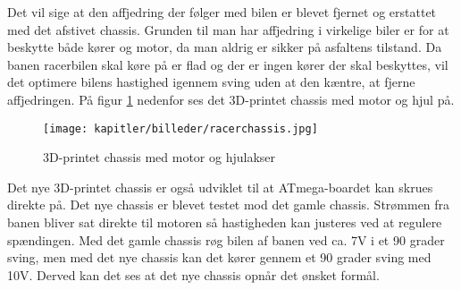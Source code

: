 Det vil sige at den affjedring der følger med bilen er blevet fjernet og erstattet med det afstivet chassis. Grunden til man har affjedring i virkelige biler er for at beskytte både kører og motor, da man aldrig er sikker på asfaltens tilstand. Da banen racerbilen skal køre på er flad og der er ingen kører der skal beskyttes, vil det optimere bilens hastighed igennem sving uden at den kæntre, at fjerne affjedringen. På figur \ref{fig:racerchassis} nedenfor ses det 3D-printet chassis med motor og hjul på.

\begin{figure}[ht]
    \centering
    \texttt{[image: kapitler/billeder/racerchassis.jpg]}
    \caption{3D-printet chassis med motor og hjulakser}
    \label{fig:racerchassis}
\end{figure}

Det nye 3D-printet chassis er også udviklet til at ATmega-boardet kan skrues direkte på. Det nye chassis er blevet testet mod det gamle chassis. Strømmen fra banen bliver sat direkte til motoren så hastigheden kan justeres ved at regulere spændingen. Med det gamle chassis røg bilen af banen ved ca. 7V i et 90 grader sving, men med det nye chassis kan det kører gennem et 90 grader sving med 10V. Derved kan det ses at det nye chassis opnår det ønsket formål. 



